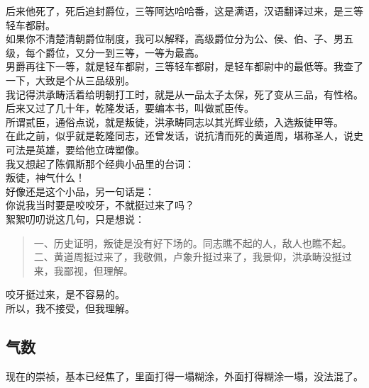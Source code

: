 \begin{multicols}{\theparacolNo}
后来他死了，死后追封爵位，三等阿达哈哈番，这是满语，汉语翻译过来，是三等轻车都尉。\\

如果你不清楚清朝爵位制度，我可以解释，高级爵位分为公、侯、伯、子、男五级，每个爵位，又分一到三等，一等为最高。\\

男爵再往下一等，就是轻车都尉，三等轻车都尉，是轻车都尉中的最低等。我查了一下，大致是个从三品级别。\\

我记得洪承畴活着给明朝打工时，就是从一品太子太保，死了变从三品，有性格。\\

后来又过了几十年，乾隆发话，要编本书，叫做贰臣传。\\

所谓贰臣，通俗点说，就是叛徒，洪承畴同志以其光辉业绩，入选叛徒甲等。\\

在此之前，似乎就是乾隆同志，还曾发话，说抗清而死的黄道周，堪称圣人，说史可法是英雄，要给他立碑塑像。\\

我又想起了陈佩斯那个经典小品里的台词：\\

叛徒，神气什么！\\

好像还是这个小品，另一句话是：\\

你说我当时要是咬咬牙，不就挺过来了吗？\\

絮絮叨叨说这几句，只是想说：
{\footnotesize \begin{quote}
	一、历史证明，叛徒是没有好下场的。同志瞧不起的人，敌人也瞧不起。\\
	二、黄道周挺过来了，我敬佩，卢象升挺过来了，我景仰，洪承畴没挺过来，我鄙视，但理解。\\
\end{quote}}

咬牙挺过来，是不容易的。\\

所以，我不接受，但我理解。\\

\subsection{气数}
现在的崇祯，基本已经焦了，里面打得一塌糊涂，外面打得糊涂一塌，没法混了。\\


\end{multicols}
